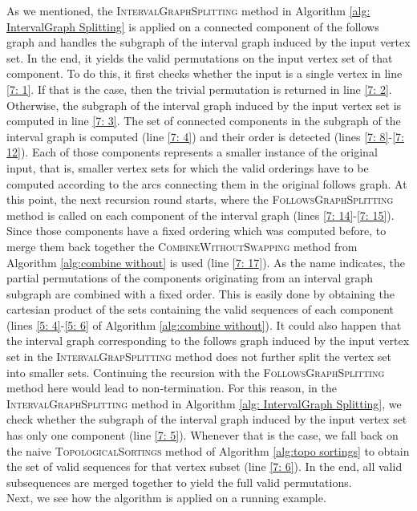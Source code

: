 As we mentioned, the \textsc{IntervalGraphSplitting} method in Algorithm \ref{alg: IntervalGraph Splitting} is applied on a connected component of the follows graph and handles the subgraph of the interval graph induced by the input vertex set. 
In the end, it yields the valid permutations on the input vertex set of that component.
To do this, it first checks whether the input is a single vertex in line \ref{7: 1}.
If that is the case, then the trivial permutation is returned in line \ref{7: 2}.
Otherwise, the subgraph of the interval graph induced by the input vertex set is computed in line \ref{7: 3}.
The set of connected components in the subgraph of the interval graph is computed (line \ref{7: 4}) and their order is detected (lines \ref{7: 8}-\ref{7: 12}).
Each of those components represents a smaller instance of the original input, that is, smaller vertex sets for which the valid orderings have to be computed according to the arcs connecting them in the original follows graph.
At this point, the next recursion round starts, where the \textsc{FollowsGraphSplitting} method is called on each component of the interval graph (lines \ref{7: 14}-\ref{7: 15}).
Since those components have a fixed ordering which was computed before, to merge them back together the \textsc{CombineWithoutSwapping} method from Algorithm \ref{alg:combine without} is used (line \ref{7: 17}).
As the name indicates, the partial permutations of the components originating from an interval graph subgraph are combined with a fixed order.
This is easily done by obtaining the cartesian product of the sets containing the valid sequences of each component (lines \ref{5: 4}-\ref{5: 6} of Algorithm \ref{alg:combine without}).
It could also happen that the interval graph corresponding to the follows graph induced by the input vertex set in the \textsc{IntervalGrapSplitting} method does not further split the vertex set into smaller sets.
Continuing the recursion with the \textsc{FollowsGraphSplitting} method here would lead to non-termination.
For this reason, in the \textsc{IntervalGraphSplitting} method in Algorithm \ref{alg: IntervalGraph Splitting}, we check whether the subgraph of the interval graph induced by the input vertex set has only one component (line \ref{7: 5}). 
Whenever that is the case, we fall back on the naive \textsc{TopologicalSortings} method of Algorithm \ref{alg:topo sortings} to obtain the set of valid sequences for that vertex subset (line \ref{7: 6}).
In the end, all valid subsequences are merged together to yield the full valid permutations.\\
Next, we see how the algorithm is applied on a running example. 
%
%
%
%
%

